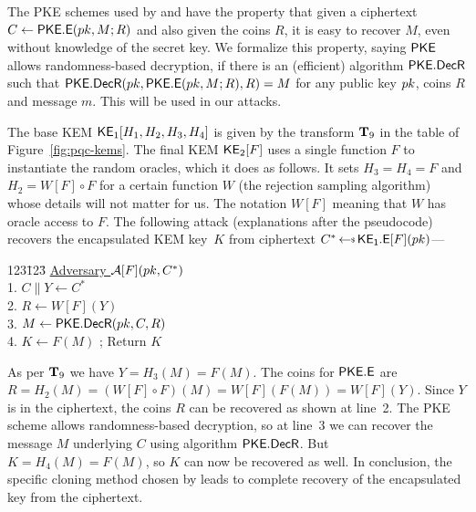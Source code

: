 
 The PKE schemes used by  and  have the property that given a ciphertext $C \gets \mathsf{{\mathsf{PKE}}.E}(pk,M;R)$ and also given the coins $R$, it is easy to recover $M$, even without knowledge of the secret key. We formalize this property, saying ${\mathsf{PKE}}$ allows randomness-based decryption, if there is an (efficient) algorithm $\mathsf{{\mathsf{PKE}}.DecR}$ such that $\mathsf{{\mathsf{PKE}}.DecR}(pk,\allowbreak \mathsf{{\mathsf{PKE}}.E}(pk, \allowbreak M; R),\allowbreak R) = M$ for any public key $pk$, coins $R$ and message $m$. This will be used in our attacks.






 The base KEM ${\mathsf{KE}}_1[H_1,H_2,H_3,H_4]$ is given by the transform $\mathbf{T}_9$ in the table of Figure~\ref{fig:pqc-kems}. The final KEM ${\mathsf{KE}}_2[F]$ uses a single function $F$ to instantiate the random oracles, which it does as follows. It sets $H_3=H_4=F$ and $H_2=W[F]\circ F$ for a certain function $W$ (the rejection sampling algorithm) whose details will not matter for us. The notation $W[F]$ meaning that $W$ has oracle access to $F$. The following attack (explanations after the pseudocode) recovers the encapsulated KEM key~$K$ from  ciphertext $C^* \getsr \GkemEnc{1}[F](\pk)$---

\begin{tabbing}
	123\=123\=\kill
	\underline{Adversary $\mathcal{A}[F](pk,C^*)$}  \\[2pt]
	1. \> $C\|Y\gets C^*$  \\
	2. \> $R\gets W[F](Y)$  \\
	3. \> $M\gets \mathsf{{\mathsf{PKE}}.DecR}(pk,C,R)$  \\
	4. \> $K \gets F(M)$ ; Return $K$
\end{tabbing}

\noindent As per $\mathbf{T}_9$ we have $Y = H_3(M) = F(M)$. The coins for $\mathsf{{\mathsf{PKE}}.E}$ are $R = H_2(M) = (W[F]\circ F)(M) = W[F](F(M)) = W[F](Y)$. Since $Y$ is in the ciphertext, the coins $R$ can be recovered as shown at line~2. The PKE scheme allows randomness-based decryption, so at line~3 we can recover the message $M$ underlying $C$ using algorithm $\mathsf{{\mathsf{PKE}}.DecR}$. But $K = H_4(M) = F(M)$, so $K$ can now be recovered as well. In conclusion, the specific cloning method chosen by  leads to complete recovery of the encapsulated key from the ciphertext.


